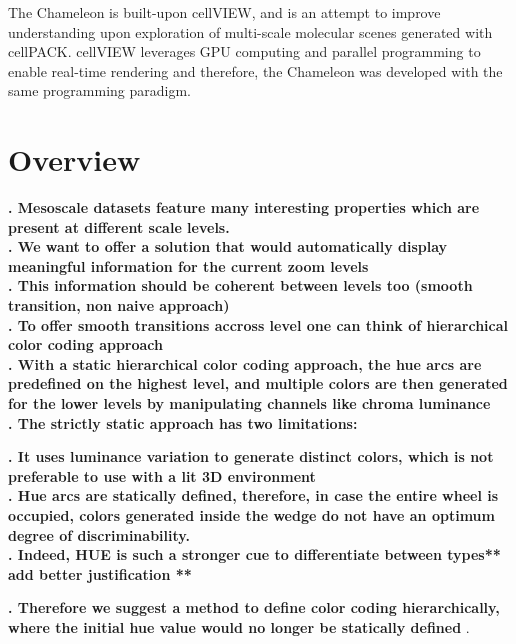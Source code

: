 \documentclass[review,journal]{vgtc}         %
\begin{document}
The Chameleon is built-upon cellVIEW, and is an attempt to improve understanding upon exploration of multi-scale molecular scenes generated with cellPACK.
cellVIEW leverages GPU computing and parallel programming to enable real-time rendering and therefore, the Chameleon was developed with the same programming paradigm.


\section{Overview}

\textbf{. Mesoscale datasets feature many interesting properties which are present at different scale levels. } \\

\textbf{. We want to offer a solution that would automatically display meaningful information for the current zoom levels} \\

\textbf{. This information should be coherent between levels too (smooth transition, non naive approach)} \\
	
\textbf{. To offer smooth transitions accross level one can think of hierarchical color coding approach} \\

\textbf{. With a static hierarchical color coding approach, the hue arcs are predefined on the highest level, and multiple colors are then generated for the lower levels by manipulating channels like chroma luminance} \\

\textbf{. The strictly static approach has two limitations:}

\textbf{. It uses luminance variation to generate distinct colors, which is not preferable to use with a lit 3D environment} \\

\textbf{. Hue arcs are statically defined, therefore, in case the entire wheel is occupied, colors generated inside the wedge do not have an optimum degree of discriminability.  } \\

\textbf{. Indeed, HUE is such a stronger cue to differentiate between types** add better justification **}

\textbf{. Therefore we suggest a method to define color coding hierarchically, where the initial hue value would no longer be statically defined }. \\
\end{document}

